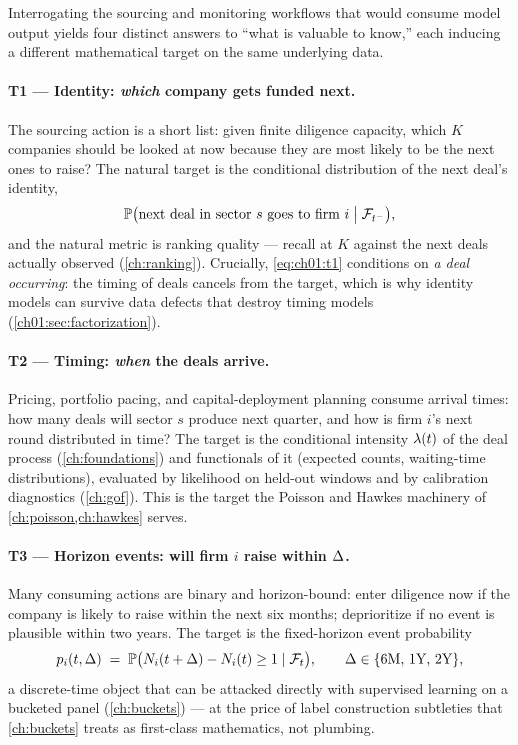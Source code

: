 Interrogating the sourcing and monitoring workflows that would consume model
output yields four distinct answers to ``what is valuable to know,'' each
inducing a different mathematical target on the same underlying data.

\paragraph{T1 --- Identity: \emph{which} company gets funded next.}
The sourcing action is a short list: given finite diligence capacity, which
$K$ companies should be looked at now because they are most likely to be the
next ones to raise? The natural target is the conditional distribution of
the next deal's identity,
\begin{equation}\label{eq:ch01:t1}
\mathbb{P}\big(\text{next deal in sector } s \text{ goes to firm } i
 \;\big|\; \mathcal{F}_{t^-}\big),
\end{equation}
and the natural metric is ranking quality --- recall at $K$ against the next
deals actually observed (\cref{ch:ranking}). Crucially, \cref{eq:ch01:t1}
conditions on \emph{a deal occurring}: the timing of deals cancels from the
target, which is why identity models can survive data defects that destroy
timing models (\cref{ch01:sec:factorization}).

\paragraph{T2 --- Timing: \emph{when} the deals arrive.}
Pricing, portfolio pacing, and capital-deployment planning consume arrival
times: how many deals will sector $s$ produce next quarter, and how is firm
$i$'s next round distributed in time? The target is the conditional
intensity $\lambda(t)$ of the deal process (\cref{ch:foundations}) and
functionals of it (expected counts, waiting-time distributions), evaluated
by likelihood on held-out windows and by calibration diagnostics
(\cref{ch:gof}). This is the target the Poisson and Hawkes machinery of
\cref{ch:poisson,ch:hawkes} serves.

\paragraph{T3 --- Horizon events: will firm $i$ raise within $\Delta$.}
Many consuming actions are binary and horizon-bound: enter diligence now if
the company is likely to raise within the next six months; deprioritize if
no event is plausible within two years. The target is the fixed-horizon
event probability
\begin{equation}\label{eq:ch01:t3}
p_{i}(t,\Delta)
 \;=\;
 \mathbb{P}\big(N_{i}(t+\Delta) - N_{i}(t) \ge 1 \mid \mathcal{F}_{t}\big),
 \qquad \Delta \in \{\text{6M},\, \text{1Y},\, \text{2Y}\},
\end{equation}
a discrete-time object that can be attacked directly with supervised
learning on a bucketed panel (\cref{ch:buckets}) --- at the price of label
construction subtleties that \cref{ch:buckets} treats as first-class
mathematics, not plumbing.

